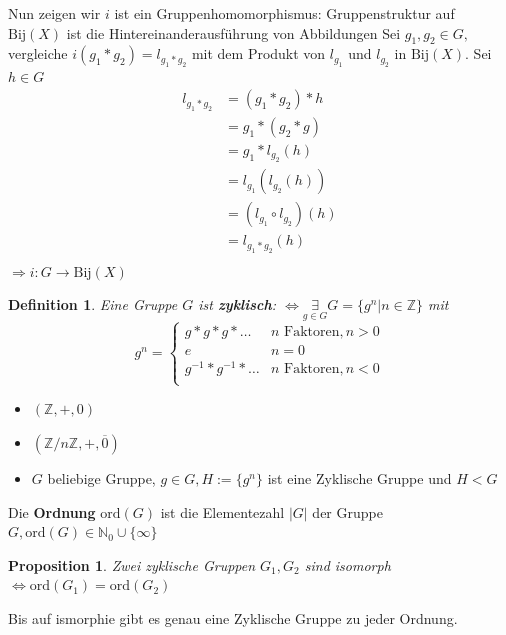 \documentclass{article}
\newtheorem{defi}[thm]{Definition}
\newtheorem{proposition}[thm]{Proposition}
\newcommand{\N}{\mathbb{N}}
\newcommand{\Z}{\mathbb{Z}}
\newcommand{\bij}{\text{Bij}}
\newcommand{\ord}{\text{ord}}
\begin{document}
Nun zeigen wir $i$ ist ein Gruppenhomomorphismus:
Gruppenstruktur auf $\bij(X)$ ist die
Hintereinanderausführung von Abbildungen
Sei $g_1,g_2\in G,$ vergleiche $i(g_1*g_2)=l_{g_1*g_2}$
mit dem Produkt von $l_{g_1}$ und $l_{g_2}$ in $\bij(X)$.
Sei $h\in G$
\begin{align*}
    l_{g_1*g_2}&=(g_1*g_2)*h\\
    &=g_1*(g_2*g)\\
    &=g_1*l_{g_2}(h)\\
    &=l_{g_1}(l_{g_2}(h))\\
    &=(l_{g_1}\circ l_{g_2})(h)\\
    &=l_{g_1*g_2}(h)\\
\end{align*}
$\Rightarrow i:G\to\bij(X)$
\begin{defi}
    Eine Gruppe $G$ ist \textbf{zyklisch}: $\Leftrightarrow
    \underset{g\in G}\exists G=\{g^n|n\in\Z\}$ mit
    \begin{equation*}
        g^n=
        \begin{cases}
            g*g*g*\hdots&n\text{ Faktoren},n>0\\
            e&n=0\\
            g^{-1}*g^{-1}*\hdots&n\text{ Faktoren},n<0\\
        \end{cases}
    \end{equation*}
\end{defi}
\color{purple}
\begin{itemize}
    \item $(\Z,+,0)$
    \item $(\Z/n\Z,+,\overline{0})$
    \item $G$ beliebige Gruppe, $g\in G, H:=\{g^n\}$ ist
        eine Zyklische Gruppe und $H<G$
\end{itemize}
\color{black}

Die \textbf{Ordnung} $\ord(G)$ ist die Elementezahl $|G|$
der Gruppe $G,\ord(G)\in\N_0\cup\{\infty\}$
\begin{proposition}
    Zwei zyklische Gruppen $G_1,G_2$ sind isomorph
    $\Leftrightarrow\ord(G_1)=\ord(G_2)$
\end{proposition}
\color{blue}
Bis auf ismorphie gibt es genau eine Zyklische Gruppe
zu jeder Ordnung.
\color{black}
\end{document}
